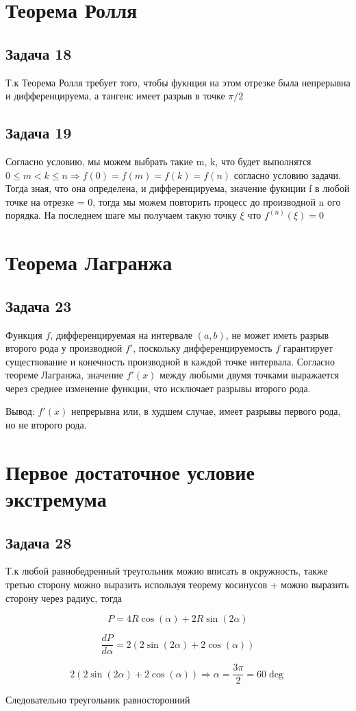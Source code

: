 \documentclass[a4paper,12pt]{article}
\begin{document}
\section{Теорема Ролля}

\subsection{Задача 18}
Т.к Теорема Ролля требует того, чтобы фукнция на этом отрезке была непрерывна и дифференцируема, а тангенс имеет разрыв в точке $\pi/2$

\subsection{Задача 19}
Согласно условию, мы можем выбрать такие m, k, что будет выполнятся $0 \le m < k \le n \Rightarrow f(0)=f(m)=f(k)=f(n)$ согласно условию задачи. Тогда зная, что она определена, и дифференцируема, значение фукнции f в любой точке на отрезке = 0, тогда мы можем повторить процесс до производной n ого порядка. На последнем шаге мы получаем такую точку $\xi$  что $f^{(n)}(\xi) = 0$

\section{Теорема Лагранжа}
\subsection{Задача 23}
Функция $ f $, дифференцируемая на интервале $(a, b)$, не может иметь разрыв второго рода у производной $ f' $, поскольку дифференцируемость $ f $ гарантирует существование и конечность производной в каждой точке интервала. Согласно теореме Лагранжа, значение $ f'(x) $ между любыми двумя точками выражается через среднее изменение функции, что исключает разрывы второго рода. 

Вывод: $ f'(x) $ непрерывна или, в худшем случае, имеет разрывы первого рода, но не второго рода.

\section{Первое достаточное условие экстремума}

\subsection{Задача 28}
Т.к любой равнобедренный треугольник можно вписать в окружность, также третью сторону можно выразить используя теорему косинусов + можно выразить сторону через радиус, тогда

\[
P = 4R \cos(\alpha) + 2R\sin(2\alpha)
\]

\[
\frac{dP}{d\alpha} = 2(2\sin(2\alpha) + 2\cos(\alpha))
\]

\[
2(2\sin(2\alpha) + 2\cos(\alpha)) \Rightarrow \alpha = \frac{3\pi}{2} = 60\deg
\]

Следовательно треугольник равносторонний
\end{document}
